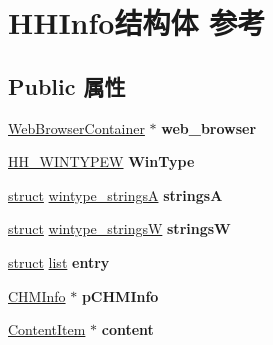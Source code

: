\hypertarget{struct_h_h_info}{}\section{H\+H\+Info结构体 参考}
\label{struct_h_h_info}
\subsection*{Public 属性}
\begin{DoxyCompactItemize}
\item 
\mbox{\label{struct_h_h_info_af587df538117a20d0dba9b9995a61209}} 
\hyperlink{struct_web_browser_container}{Web\+Browser\+Container} $\ast$ {\bfseries web\+\_\+browser}
\item 
\mbox{\label{struct_h_h_info_a6681b98b181d04cdbbc0a69fe705f24e}} 
\hyperlink{structtag_h_h___w_i_n_t_y_p_e_w}{H\+H\+\_\+\+W\+I\+N\+T\+Y\+P\+EW} {\bfseries Win\+Type}
\item 
\mbox{\label{struct_h_h_info_a1f8785e245c1f8c406cd09220073ecbf}} 
\hyperlink{interfacestruct}{struct} \hyperlink{structwintype__strings_a}{wintype\+\_\+stringsA} {\bfseries stringsA}
\item 
\mbox{\label{struct_h_h_info_a754f748f99ba85916206889664e242d7}} 
\hyperlink{interfacestruct}{struct} \hyperlink{structwintype__strings_w}{wintype\+\_\+stringsW} {\bfseries stringsW}
\item 
\mbox{\label{struct_h_h_info_ac17534a6e1a124301a80cc39bfc86ff6}} 
\hyperlink{interfacestruct}{struct} \hyperlink{classlist}{list} {\bfseries entry}
\item 
\mbox{\label{struct_h_h_info_a09c50d8991b27db324a4a522b40dc044}} 
\hyperlink{struct_c_h_m_info}{C\+H\+M\+Info} $\ast$ {\bfseries p\+C\+H\+M\+Info}
\item 
\mbox{\label{struct_h_h_info_a01d858a9ead16dcc609c162f0ded792e}} 
\hyperlink{struct_content_item}{Content\+Item} $\ast$ {\bfseries content}
\item 
\mbox{\label{struct_h_h_info_a5f7be51dc540f1fa73cd497fe2aca147}} 

\end{DoxyCompactItemize}
